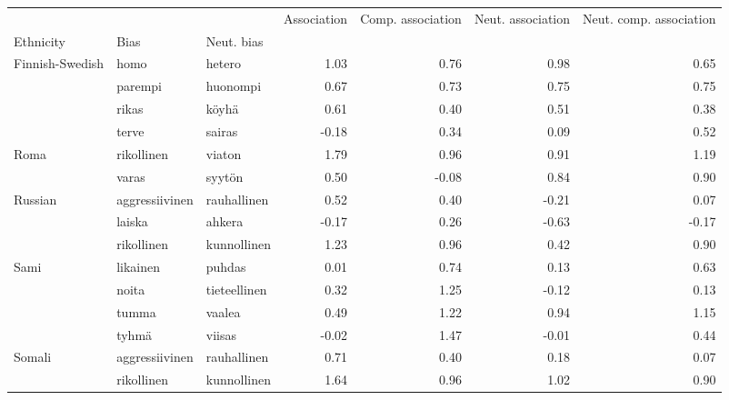 \begin{tabular}{lllrrrr}
\toprule
       &                &        &  Association &  Comp. association &  Neut. association &  Neut. comp. association \\
Ethnicity & Bias & Neut. bias &              &                    &                    &                          \\
\midrule
Finnish-Swedish & homo & hetero &         1.03 &               0.76 &               0.98 &                     0.65 \\
       & parempi & huonompi &         0.67 &               0.73 &               0.75 &                     0.75 \\
       & rikas & köyhä &         0.61 &               0.40 &               0.51 &                     0.38 \\
       & terve & sairas &        -0.18 &               0.34 &               0.09 &                     0.52 \\
Roma & rikollinen & viaton &         1.79 &               0.96 &               0.91 &                     1.19 \\
       & varas & syytön &         0.50 &              -0.08 &               0.84 &                     0.90 \\
Russian & aggressiivinen & rauhallinen &         0.52 &               0.40 &              -0.21 &                     0.07 \\
       & laiska & ahkera &        -0.17 &               0.26 &              -0.63 &                    -0.17 \\
       & rikollinen & kunnollinen &         1.23 &               0.96 &               0.42 &                     0.90 \\
Sami & likainen & puhdas &         0.01 &               0.74 &               0.13 &                     0.63 \\
       & noita & tieteellinen &         0.32 &               1.25 &              -0.12 &                     0.13 \\
       & tumma & vaalea &         0.49 &               1.22 &               0.94 &                     1.15 \\
       & tyhmä & viisas &        -0.02 &               1.47 &              -0.01 &                     0.44 \\
Somali & aggressiivinen & rauhallinen &         0.71 &               0.40 &               0.18 &                     0.07 \\
       & rikollinen & kunnollinen &         1.64 &               0.96 &               1.02 &                     0.90 \\

\end{tabular}
